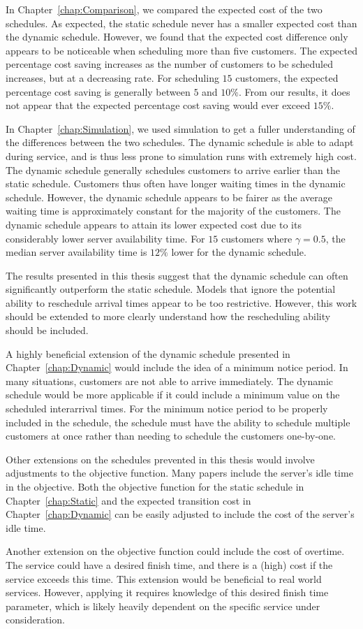 In Chapter~\ref{chap:Comparison}, we compared the expected cost of the two schedules. As expected, the static schedule never has a smaller expected cost than the dynamic schedule. However, we found that the expected cost difference only appears to be noticeable when scheduling more than five customers. The expected percentage cost saving increases as the number of customers to be scheduled increases, but at a decreasing rate. For scheduling $15$ customers, the expected percentage cost saving is generally between $5$ and $10\%$. From our results, it does not appear that the expected percentage cost saving would ever exceed $15\%$.

In Chapter~\ref{chap:Simulation}, we used simulation to get a fuller understanding of the differences between the two schedules. The dynamic schedule is able to adapt during service, and is thus less prone to simulation runs with extremely high cost. The dynamic schedule generally schedules customers to arrive earlier than the static schedule. Customers thus often have longer waiting times in the dynamic schedule. However, the dynamic schedule appears to be fairer as the average waiting time is approximately constant for the majority of the customers. The dynamic schedule appears to attain its lower expected cost due to its considerably lower server availability time. For $15$ customers where $\gamma = 0.5$, the median server availability time is $12 \%$ lower for the dynamic schedule.

The results presented in this thesis suggest that the dynamic schedule can often significantly outperform the static schedule. Models that ignore the potential ability to reschedule arrival times appear to be too restrictive. However, this work should be extended to more clearly understand how the rescheduling ability should be included.

A highly beneficial extension of the dynamic schedule presented in Chapter~\ref{chap:Dynamic} would include the idea of a minimum notice period. In many situations, customers are not able to arrive immediately. The dynamic schedule would be more applicable if it could include a minimum value on the scheduled interarrival times. For the minimum notice period to be properly included in the schedule, the schedule must have the ability to schedule multiple customers at once rather than needing to schedule the customers one-by-one.

Other extensions on the schedules prevented in this thesis would involve adjustments to the objective function. Many papers include the server's idle time in the objective. Both the objective function for the static schedule in Chapter~\ref{chap:Static} and the expected transition cost in Chapter~\ref{chap:Dynamic} can be easily adjusted to include the cost of the server's idle time.

Another extension on the objective function could include the cost of overtime. The service could have a desired finish time, and there is a (high) cost if the service exceeds this time. This extension would be beneficial to real world services. However, applying it requires knowledge of this desired finish time parameter, which is likely heavily dependent on the specific service under consideration.